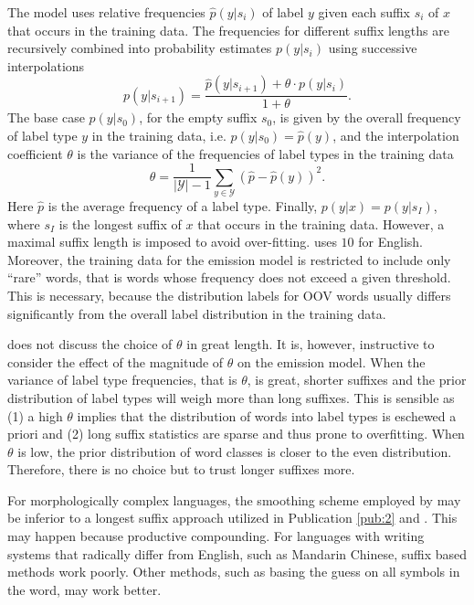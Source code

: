 The model uses relative frequencies $\hat{p}(y|s_i)$ of label $y$ given
each suffix $s_i$ of $x$ that occurs in the training data. The
frequencies for different suffix lengths are recursively combined into
probability estimates $p(y|s_i)$ using successive interpolations
$$p(y|s_{i+1}) = \frac{\hat{p}(y|s_{i+1}) + \theta \cdot p(y|s_{i})}{1 + \theta}.$$
The base case $p(y|s_0)$, for the empty suffix $s_0$, is given by the
overall frequency of label type $y$ in the training data,
i.e. $p(y|s_0) = \hat{p}(y)$, and the interpolation coefficient
$\theta$ is the variance of the frequencies of label types in the
training data
$$\theta = \frac{1}{|\mathcal{Y}| - 1} \sum_{y\in \mathcal{Y}} (\hat{p} - \hat{p}(y))^2.$$
Here $\hat{p}$ is the average frequency of a label type. Finally,
$p(y|x) = p(y|s_I)$, where $s_I$ is the longest suffix of $x$ that
occurs in the training data. However, a maximal suffix length is
imposed to avoid over-fitting. \cite{Brants2000} uses $10$ for
English. Moreover, the training data for the emission model is
restricted to include only ``rare'' words, that is words whose
frequency does not exceed a given threshold. This is necessary,
because the distribution labels for OOV words usually differs
significantly from the overall label distribution in the training
data.

\cite{Brants2000} does not discuss the choice of $\theta$ in great
length. It is, however, instructive to consider the effect of the
magnitude of $\theta$ on the emission model.  When the variance of
label type frequencies, that is $\theta$, is great, shorter suffixes
and the prior distribution of label types will weigh more than long
suffixes. This is sensible as (1) a high $\theta$ implies that the
distribution of words into label types is eschewed a priori and (2)
long suffix statistics are sparse and thus prone to overfitting. When
$\theta$ is low, the prior distribution of word classes is closer to
the even distribution. Therefore, there is no choice but to trust
longer suffixes more.

For morphologically complex languages, the smoothing scheme employed
by \cite{Brants2000} may be inferior to a longest suffix approach
utilized in Publication \ref{pub:2} and \cite{Linden2009}. This may
happen because productive compounding. For languages with writing
systems that radically differ from English, such as Mandarin Chinese,
suffix based methods work poorly. Other methods, such as basing the
guess on all symbols in the word, may work better. %
 
